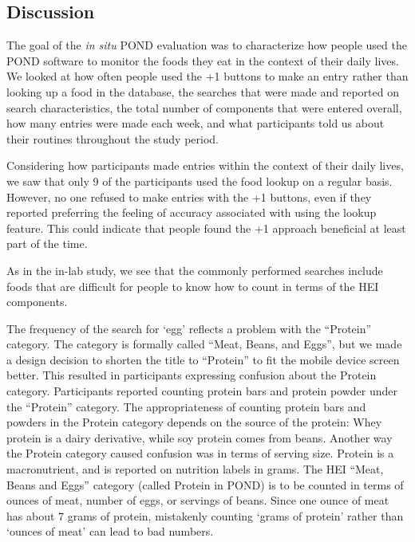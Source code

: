 \subsection{Discussion}
The goal of the \textit{in situ} POND evaluation was to characterize how people used the POND software to monitor the foods they eat in the context of their daily lives. We looked at how often people used the +1 buttons to make an entry rather than looking up a food in the database, the searches that were made and reported on search characteristics, the total number of components that were entered overall, how many entries were made each week, and what participants told us about their routines throughout the study period. 

Considering how participants made entries within the context of their daily lives, we saw that only 9 of the participants used the food lookup on a regular basis. However, no one refused to make entries with the +1 buttons, even if they reported preferring the feeling of accuracy associated with using the lookup feature. This could indicate that people found the +1 approach beneficial at least part of the time. 

As in the in-lab study, we see that the commonly performed searches include foods that are difficult for people to know how to count in terms of the HEI components. 

The frequency of the search for `egg' reflects a problem with the ``Protein'' category. The category is formally called ``Meat, Beans, and Eggs'', but we made a design decision to shorten the title to ``Protein'' to fit the mobile device screen better. This resulted in participants expressing confusion about the Protein category. Participants reported counting protein bars and protein powder under the ``Protein'' category. The appropriateness of counting protein bars and powders in the Protein category depends on the source of the protein: Whey protein is a dairy derivative, while soy protein comes from beans. Another way the Protein category caused confusion was in terms of serving size. Protein is a macronutrient, and is reported on nutrition labels in grams. The HEI ``Meat, Beans and Eggs'' category (called Protein in POND) is to be counted in terms of ounces of meat, number of eggs, or servings of beans. Since one ounce of meat has about 7 grams of protein, mistakenly counting `grams of protein' rather than `ounces of meat' can lead to bad numbers. 

